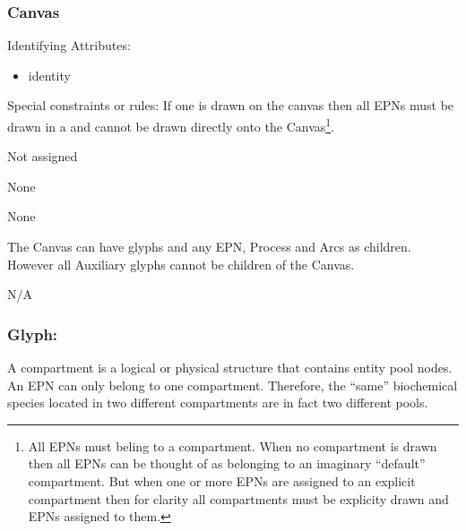 \subsubsection{Canvas}


\begin{glyphDescription}
\item[Identifying Attributes:]\mbox{}
  \begin{itemize}
  \item identity
 \end{itemize}
\item[Special constraints or rules:]\mbox{}\newline If one
   is drawn on the canvas then all EPNs must be
  drawn in a  and cannot be drawn directly onto the
  Canvas\footnote{All EPNs must beling to a compartment. When no compartment is drawn then all EPNs can be
    thought of as belonging to an imaginary ``default''
    compartment. But when one or more EPNs are assigned to an explicit
  compartment then for clarity all compartments must be explicity
  drawn and EPNs assigned to them.}.

\glyphSboTerm Not assigned

\glyphContainer None

\glyphLabel None

\glyphAux The Canvas can have  glyphs and any EPN,
Process and Arcs as children. However all Auxiliary glyphs cannot be
children of the Canvas.
 
\glyphCloning N/A

\end{glyphDescription}


\subsubsection{Glyph: }\label{sec:compartment}

A compartment is a logical or physical structure that contains entity pool nodes. An EPN can only belong to one compartment. Therefore, the ``same'' biochemical species located in two different compartments are in fact two different pools.

